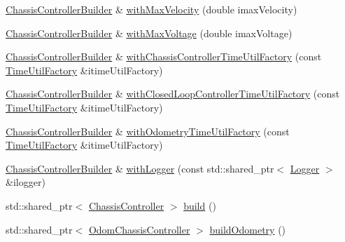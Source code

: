 \begin{DoxyCompactItemize}
\item 
\mbox{\hyperlink{classokapi_1_1ChassisControllerBuilder}{Chassis\+Controller\+Builder}} \& \mbox{\hyperlink{classokapi_1_1ChassisControllerBuilder_aee0580c75bf16663f065aad88fdc795d}{with\+Max\+Velocity}} (double imax\+Velocity)
\item 
\mbox{\hyperlink{classokapi_1_1ChassisControllerBuilder}{Chassis\+Controller\+Builder}} \& \mbox{\hyperlink{classokapi_1_1ChassisControllerBuilder_a7bf0a781b124ae39c8fc46786d18243a}{with\+Max\+Voltage}} (double imax\+Voltage)
\item 
\mbox{\hyperlink{classokapi_1_1ChassisControllerBuilder}{Chassis\+Controller\+Builder}} \& \mbox{\hyperlink{classokapi_1_1ChassisControllerBuilder_a1ca2919cbd6fa19b34aeaa1eeee98462}{with\+Chassis\+Controller\+Time\+Util\+Factory}} (const \mbox{\hyperlink{classokapi_1_1TimeUtilFactory}{Time\+Util\+Factory}} \&itime\+Util\+Factory)
\item 
\mbox{\hyperlink{classokapi_1_1ChassisControllerBuilder}{Chassis\+Controller\+Builder}} \& \mbox{\hyperlink{classokapi_1_1ChassisControllerBuilder_a5bf13424f9357099d6e4d336cc0cec98}{with\+Closed\+Loop\+Controller\+Time\+Util\+Factory}} (const \mbox{\hyperlink{classokapi_1_1TimeUtilFactory}{Time\+Util\+Factory}} \&itime\+Util\+Factory)
\item 
\mbox{\hyperlink{classokapi_1_1ChassisControllerBuilder}{Chassis\+Controller\+Builder}} \& \mbox{\hyperlink{classokapi_1_1ChassisControllerBuilder_ab601ad0881616b9af271d19c820ca3f2}{with\+Odometry\+Time\+Util\+Factory}} (const \mbox{\hyperlink{classokapi_1_1TimeUtilFactory}{Time\+Util\+Factory}} \&itime\+Util\+Factory)
\item 
\mbox{\hyperlink{classokapi_1_1ChassisControllerBuilder}{Chassis\+Controller\+Builder}} \& \mbox{\hyperlink{classokapi_1_1ChassisControllerBuilder_ac2ba4b3f5a3b08e611ea21e0d9406250}{with\+Logger}} (const std\+::shared\+\_\+ptr$<$ \mbox{\hyperlink{classokapi_1_1Logger}{Logger}} $>$ \&ilogger)
\item 
std\+::shared\+\_\+ptr$<$ \mbox{\hyperlink{classokapi_1_1ChassisController}{Chassis\+Controller}} $>$ \mbox{\hyperlink{classokapi_1_1ChassisControllerBuilder_a5dfd1f4d60a3c4bfcc28a57211c1a6a2}{build}} ()
\item 
std\+::shared\+\_\+ptr$<$ \mbox{\hyperlink{classokapi_1_1OdomChassisController}{Odom\+Chassis\+Controller}} $>$ \mbox{\hyperlink{classokapi_1_1ChassisControllerBuilder_a9c631ea817466483aa2cfcb886f6d892}{build\+Odometry}} ()
\end{DoxyCompactItemize}


